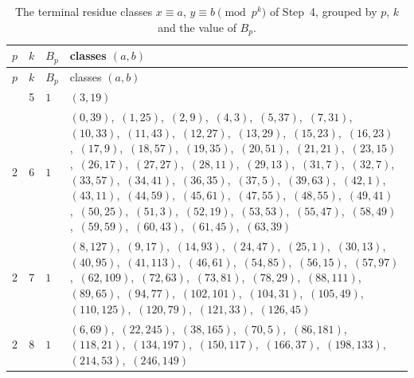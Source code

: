 \documentclass[11pt]{article}
\begin{document}
\begingroup\small
\setlength{\LTcapwidth}{\textwidth}
\begin{longtable}{@{}rrl>{\raggedright\arraybackslash}p{}@{}}
\caption{The terminal residue classes $x\equiv a$, $y\equiv b\pmod{p^k}$ of Step~4, grouped by $p$, $k$ and the value of $B_p$.}\label{tab:local}\\
\hline $p$ & $k$ & $B_p$ & classes $(a,b)$\\\hline\endfirsthead
\hline $p$ & $k$ & $B_p$ & classes $(a,b)$\\\hline\endhead\hline\endfoot
2 & 5 & $1$ & $(3,19)$\\
2 & 6 & $1$ & $(0,39)$,\allowbreak\ $(1,25)$,\allowbreak\ $(2,9)$,\allowbreak\ $(4,3)$,\allowbreak\ $(5,37)$,\allowbreak\ $(7,31)$,\allowbreak\ $(10,33)$,\allowbreak\ $(11,43)$,\allowbreak\ $(12,27)$,\allowbreak\ $(13,29)$,\allowbreak\ $(15,23)$,\allowbreak\ $(16,23)$,\allowbreak\ $(17,9)$,\allowbreak\ $(18,57)$,\allowbreak\ $(19,35)$,\allowbreak\ $(20,51)$,\allowbreak\ $(21,21)$,\allowbreak\ $(23,15)$,\allowbreak\ $(26,17)$,\allowbreak\ $(27,27)$,\allowbreak\ $(28,11)$,\allowbreak\ $(29,13)$,\allowbreak\ $(31,7)$,\allowbreak\ $(32,7)$,\allowbreak\ $(33,57)$,\allowbreak\ $(34,41)$,\allowbreak\ $(36,35)$,\allowbreak\ $(37,5)$,\allowbreak\ $(39,63)$,\allowbreak\ $(42,1)$,\allowbreak\ $(43,11)$,\allowbreak\ $(44,59)$,\allowbreak\ $(45,61)$,\allowbreak\ $(47,55)$,\allowbreak\ $(48,55)$,\allowbreak\ $(49,41)$,\allowbreak\ $(50,25)$,\allowbreak\ $(51,3)$,\allowbreak\ $(52,19)$,\allowbreak\ $(53,53)$,\allowbreak\ $(55,47)$,\allowbreak\ $(58,49)$,\allowbreak\ $(59,59)$,\allowbreak\ $(60,43)$,\allowbreak\ $(61,45)$,\allowbreak\ $(63,39)$\\
2 & 7 & $1$ & $(8,127)$,\allowbreak\ $(9,17)$,\allowbreak\ $(14,93)$,\allowbreak\ $(24,47)$,\allowbreak\ $(25,1)$,\allowbreak\ $(30,13)$,\allowbreak\ $(40,95)$,\allowbreak\ $(41,113)$,\allowbreak\ $(46,61)$,\allowbreak\ $(54,85)$,\allowbreak\ $(56,15)$,\allowbreak\ $(57,97)$,\allowbreak\ $(62,109)$,\allowbreak\ $(72,63)$,\allowbreak\ $(73,81)$,\allowbreak\ $(78,29)$,\allowbreak\ $(88,111)$,\allowbreak\ $(89,65)$,\allowbreak\ $(94,77)$,\allowbreak\ $(102,101)$,\allowbreak\ $(104,31)$,\allowbreak\ $(105,49)$,\allowbreak\ $(110,125)$,\allowbreak\ $(120,79)$,\allowbreak\ $(121,33)$,\allowbreak\ $(126,45)$\\
2 & 8 & $1$ & $(6,69)$,\allowbreak\ $(22,245)$,\allowbreak\ $(38,165)$,\allowbreak\ $(70,5)$,\allowbreak\ $(86,181)$,\allowbreak\ $(118,21)$,\allowbreak\ $(134,197)$,\allowbreak\ $(150,117)$,\allowbreak\ $(166,37)$,\allowbreak\ $(198,133)$,\allowbreak\ $(214,53)$,\allowbreak\ $(246,149)$\\

\end{longtable}
\end{document}
